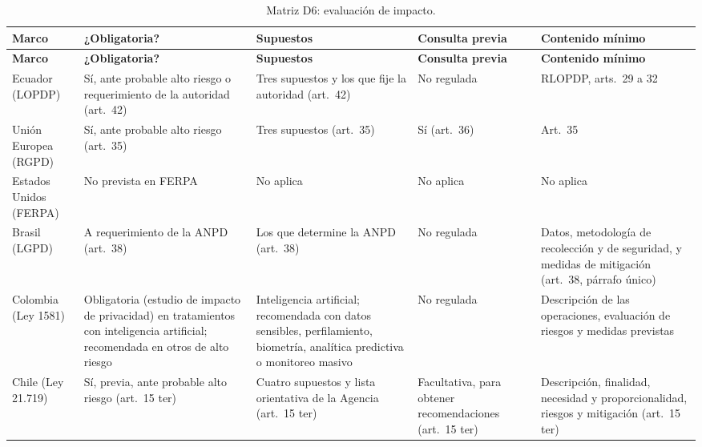 {\scriptsize
\renewcommand{\arraystretch}{1.12}
\begin{xltabular}{\textwidth}{|>{\raggedright\arraybackslash}p{2.0cm}|L|L|L|L|}
  \caption{Matriz D6: evaluación de impacto.}
  \label{tab:matriz_d6} \\
  \hline
  \textbf{Marco} & \textbf{¿Obligatoria?} & \textbf{Supuestos} & \textbf{Consulta previa} & \textbf{Contenido mínimo} \\
  \hline
  \endfirsthead
  \hline
  \textbf{Marco} & \textbf{¿Obligatoria?} & \textbf{Supuestos} & \textbf{Consulta previa} & \textbf{Contenido mínimo} \\
  \hline
  \endhead
  \hline
  \endlastfoot
  Ecuador (LOPDP) & Sí, ante probable alto riesgo o requerimiento de la autoridad (art.~42) & Tres supuestos y los que fije la autoridad (art.~42) & No regulada & RLOPDP, arts.~29 a 32 \\ \hline
  Unión Europea (RGPD) & Sí, ante probable alto riesgo (art.~35) \cite{rgpd2016} & Tres supuestos (art.~35) & Sí (art.~36) & Art.~35 \\ \hline
  Estados Unidos (FERPA) & No prevista en FERPA & No aplica & No aplica & No aplica \\ \hline
  Brasil (LGPD) & A requerimiento de la ANPD (art.~38) \cite{brasil2018lgpd} & Los que determine la ANPD (art.~38) & No regulada & Datos, metodología de recolección y de seguridad, y medidas de mitigación (art.~38, párrafo único) \\ \hline
  Colombia (Ley 1581) & Obligatoria (estudio de impacto de privacidad) en tratamientos con inteligencia artificial; recomendada en otros de alto riesgo \cite{sic2026universitario} & Inteligencia artificial; recomendada con datos sensibles, perfilamiento, biometría, analítica predictiva o monitoreo masivo & No regulada & Descripción de las operaciones, evaluación de riesgos y medidas previstas \cite{sic2026universitario} \\ \hline
  Chile (Ley 21.719) & Sí, previa, ante probable alto riesgo (art.~15 ter) & Cuatro supuestos y lista orientativa de la Agencia (art.~15 ter) & Facultativa, para obtener recomendaciones (art.~15 ter) & Descripción, finalidad, necesidad y proporcionalidad, riesgos y mitigación (art.~15 ter) \\ \hline
\end{xltabular}
}

